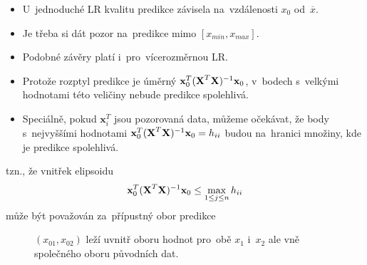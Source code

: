 \begin{example}
	\begin{remark}[Extrapolace]
	    \begin{itemize}
	    \item U~jednoduché LR kvalitu predikce závisela na~vzdálenosti $x_0$ od~$\overline{x}$.
	    \item Je třeba si dát pozor na~predikce mimo $[x_{min},x_{max}]$.
	    \item Podobné závěry platí i~pro~vícerozměrnou LR.
	    \item Protože rozptyl predikce je úměrný $\textbf{x}_0^T(\textbf{X}^T \textbf{X})^{-1} \textbf{x}_0$, v~bodech s~velkými hodnotami této veličiny nebude predikce spolehlivá.
	    \item Speciálně, pokud $\textbf{x}_i^T$ jsou pozorovaná data, můžeme očekávat, že body s~nejvyššími hodnotami $\textbf{x}_0^T(\textbf{X}^T \textbf{X})^{-1} \textbf{x}_0 = h_{ii}$ budou na~hranici množiny, kde je predikce spolehlivá.
	    \end{itemize}
	    tzn., že vnitřek elipsoidu
	 $$
	       \textbf{x}_0^T(\textbf{X}^T \textbf{X})^{-1} \textbf{x}_0 \leq     \max_{1 \leq j \leq n} h_{ii}
	 $$
	    může být považován za~přípustný obor predikce
	    \begin{figure}[h]
	\centering
    \caption{ $(x_{01},x_{02})$ leží uvnitř oboru hodnot pro~obě $x_1$ i~$x_2$ ale vně společného oboru původních dat.}
\end{figure}
	\end{remark}
\end{example}
